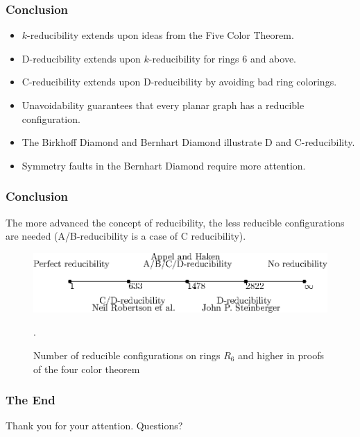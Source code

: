 \begin{frame}
    \frametitle{Conclusion}
    \begin{itemize}
        \item $k$-reducibility extends upon ideas from the Five Color Theorem.
        \item D-reducibility extends upon $k$-reducibility for rings 6 and above.
        \item C-reducibility extends upon D-reducibility by avoiding bad ring colorings.
        \item Unavoidability guarantees that every planar graph has a reducible configuration.
        \item The Birkhoff Diamond and Bernhart Diamond illustrate D and C-reducibility.
        \item Symmetry faults in the Bernhart Diamond require more attention.
    \end{itemize}
\end{frame}

\begin{frame}
    \frametitle{Conclusion}

    The more advanced the concept of reducibility, the less reducible configurations are needed (A/B-reducibility is a case of C reducibility).

    \vspace{1cm}
    \begin{figure}
        \centering
        \includegraphics[width=1.0\textwidth]{images/reduce.eps}
        \caption{Number of reducible configurations on rings $R_6$ and higher in proofs of the four color theorem}.
    \end{figure}

\end{frame}

\begin{frame}
    \frametitle{The End}
    Thank you for your attention. Questions?
\end{frame}